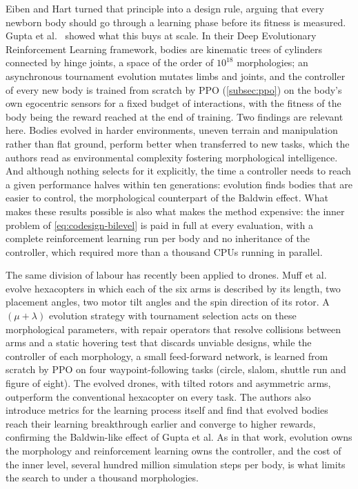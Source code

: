 Eiben and Hart \cite{eiben2020evolves} turned that principle into a design rule, arguing that every newborn body should go through a learning phase before its fitness is measured. Gupta et al.\ \cite{gupta2021embodied} showed what this buys at scale. In their Deep Evolutionary Reinforcement Learning framework, bodies are kinematic trees of cylinders connected by hinge joints, a space of the order of $10^{18}$ morphologies; an asynchronous tournament evolution mutates limbs and joints, and the controller of every new body is trained from scratch by PPO (\autoref{subsec:ppo}) on the body's own egocentric sensors for a fixed budget of interactions, with the fitness of the body being the reward reached at the end of training. Two findings are relevant here. Bodies evolved in harder environments, uneven terrain and manipulation rather than flat ground, perform better when transferred to new tasks, which the authors read as environmental complexity fostering morphological intelligence. And although nothing selects for it explicitly, the time a controller needs to reach a given performance halves within ten generations: evolution finds bodies that are easier to control, the morphological counterpart of the Baldwin effect. What makes these results possible is also what makes the method expensive: the inner problem of \eqref{eq:codesign-bilevel} is paid in full at every evaluation, with a complete reinforcement learning run per body and no inheritance of the controller, which required more than a thousand CPUs running in parallel.

The same division of labour has recently been applied to drones. Muff et al.\ \cite{muff2026hexacopters} evolve hexacopters in which each of the six arms is described by its length, two placement angles, two motor tilt angles and the spin direction of its rotor. A $(\mu+\lambda)$ evolution strategy with tournament selection acts on these morphological parameters, with repair operators that resolve collisions between arms and a static hovering test that discards unviable designs, while the controller of each morphology, a small feed-forward network, is learned from scratch by PPO on four waypoint-following tasks (circle, slalom, shuttle run and figure of eight). The evolved drones, with tilted rotors and asymmetric arms, outperform the conventional hexacopter on every task. The authors also introduce metrics for the learning process itself and find that evolved bodies reach their learning breakthrough earlier and converge to higher rewards, confirming the Baldwin-like effect of Gupta et al. As in that work, evolution owns the morphology and reinforcement learning owns the controller, and the cost of the inner level, several hundred million simulation steps per body, is what limits the search to under a thousand morphologies.

